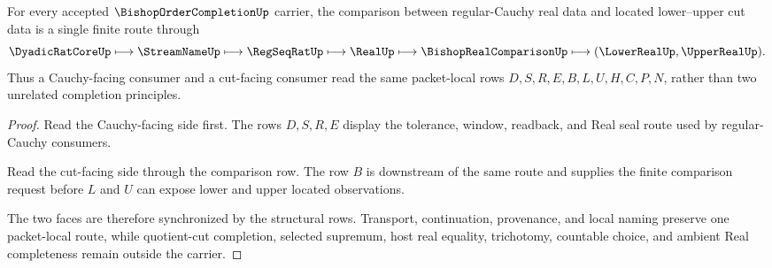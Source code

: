 \begin{theorem}
\label{thm:bishop-order-completion-cauchy-cut-comparison}
For every accepted $\BishopOrderCompletionUp$ carrier, the comparison between regular-Cauchy real data and located lower--upper cut data is a single finite route through
$$
\DyadicRatCoreUp\longmapsto\StreamNameUp\longmapsto\RegSeqRatUp\longmapsto\RealUp\longmapsto\BishopRealComparisonUp\longmapsto(\LowerRealUp,\UpperRealUp).
$$
Thus a Cauchy-facing consumer and a cut-facing consumer read the same packet-local rows $D,S,R,E,B,L,U,H,C,P,N$, rather than two unrelated completion principles.
\end{theorem}
\begin{proof}
Read the Cauchy-facing side first. The rows $D,S,R,E$ display the tolerance, window, readback, and Real seal route used by regular-Cauchy consumers.

Read the cut-facing side through the comparison row. The row $B$ is downstream of the same route and supplies the finite comparison request before $L$ and $U$ can expose lower and upper located observations.

The two faces are therefore synchronized by the structural rows. Transport, continuation, provenance, and local naming preserve one packet-local route, while quotient-cut completion, selected supremum, host real equality, trichotomy, countable choice, and ambient Real completeness remain outside the carrier.
\end{proof}




